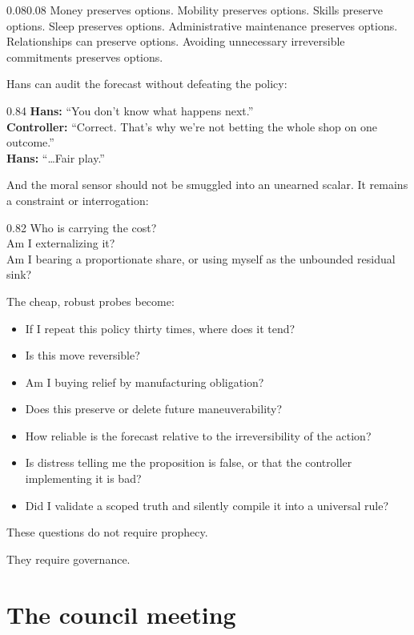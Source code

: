 \documentclass[10pt,letterpaper]{article}
\providecommand{\tightlist}{%
  \setlength{\itemsep}{0.15em}\setlength{\parskip}{0pt}}
\newenvironment{paperbody}
  {\begin{adjustwidth}{0.08\textwidth}{0.08\textwidth}\justifying}
  {\par\end{adjustwidth}}
\newenvironment{voicebox}
  {\Needspace{3.5\baselineskip}\par\vspace{0.22em}\begin{center}\begingroup
   \begin{lrbox}{\voiceboxsave}\begin{varwidth}{0.82\linewidth}
   \small\rmfamily\upshape\RaggedRight}
  {\end{varwidth}\end{lrbox}\fbox{\usebox{\voiceboxsave}}
   \endgroup\end{center}\vspace{0.22em}}
\newenvironment{dialoguebox}
  {\Needspace{5\baselineskip}\par\vspace{0.26em}\begin{center}\begingroup
   \begin{lrbox}{\dialogueboxsave}\begin{varwidth}{0.84\linewidth}
   \small\rmfamily\upshape\RaggedRight}
  {\end{varwidth}\end{lrbox}\fbox{\usebox{\dialogueboxsave}}
   \endgroup\end{center}\vspace{0.26em}}
\let\oldsection\section
\renewcommand{\section}{\Needspace{6\baselineskip}\oldsection}
\begin{document}
\begin{paperbody}
Money preserves options. Mobility preserves options. Skills preserve
options. Sleep preserves options. Administrative maintenance preserves
options. Relationships can preserve options. Avoiding unnecessary
irreversible commitments preserves options.

Hans can audit the forecast without defeating the policy:

\begin{dialoguebox}
\textbf{Hans:} ``You don't know what happens next.''\\[0.35em]
\textbf{Controller:} ``Correct. That's why we're not betting the whole
shop on one outcome.''\\[0.35em]
\textbf{Hans:} ``\ldots Fair play.''
\end{dialoguebox}

And the moral sensor should not be smuggled into an unearned scalar. It
remains a constraint or interrogation:

\begin{voicebox}
Who is carrying the cost?\\
Am I externalizing it?\\
Am I bearing a proportionate share, or using myself as the unbounded
residual sink?
\end{voicebox}

The cheap, robust probes become:

\begin{itemize}
\tightlist
\item
  If I repeat this policy thirty times, where does it tend?
\item
  Is this move reversible?
\item
  Am I buying relief by manufacturing obligation?
\item
  Does this preserve or delete future maneuverability?
\item
  How reliable is the forecast relative to the irreversibility of the
  action?
\item
  Is distress telling me the proposition is false, or that the
  controller implementing it is bad?
\item
  Did I validate a scoped truth and silently compile it into a universal
  rule?
\end{itemize}

These questions do not require prophecy.

They require governance.

\section{The council meeting}\label{the-council-meeting}


\end{paperbody}
\end{document}
